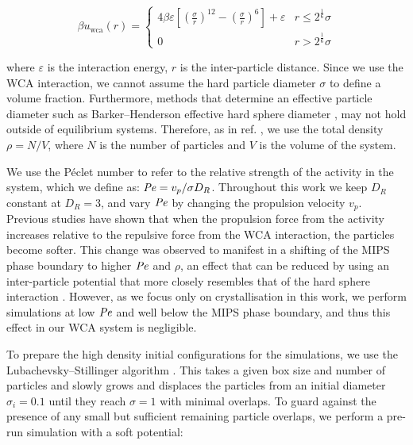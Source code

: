 \begin{equation}
\beta u_\mathrm{wca}(r) = \begin{cases}
4 \beta \varepsilon\left[\left(\frac{\sigma}{r}\right)^{12} - \left(\frac{\sigma}{r}\right)^{6}\right] + \varepsilon & r \leq 2^{\frac{1}{6}}\sigma \\%
0 & r > 2^{\frac{1}{6}}\sigma   
\end{cases}
\label{eqWCA}
\end{equation}


\noindent
where $\varepsilon$ is the interaction energy, $r$ is the inter-particle distance. Since we use the WCA interaction, we cannot assume the hard particle diameter $\sigma$ to define a volume fraction. Furthermore, methods that determine an effective particle diameter such as Barker--Henderson effective hard sphere diameter \cite{barker1967}, may not hold outside of equilibrium systems. Therefore, as in ref. \cite{martin-roca2021}, we use the total density $\rho = N / V$, where $N$ is the number of particles and $V$ is the volume of the system.  

We use the P\'{e}clet number to refer to the relative strength of the activity in the system, which we define as: $\operatorname{\mathit{P\kern-.08em e}} = v_p/\sigma D_{R}$. Throughout this work we keep $D_R$ constant at $D_R =3$, and vary $\operatorname{\mathit{P\kern-.08em e}}$ by changing the propulsion velocity $v_p$. Previous studies \cite{stenhammar2014,martin-roca2021} have shown that when the propulsion force from the activity increases relative to the repulsive force from the WCA interaction, the particles become softer. This change was observed to manifest in a shifting of the MIPS phase boundary to higher $\operatorname{\mathit{P\kern-.08em e}}$ and $\rho$, an effect that can be reduced by using an inter-particle potential that more closely resembles that of the hard sphere interaction \cite{martin-roca2021}. However, as we focus only on crystallisation in this work, we perform simulations at low $\operatorname{\mathit{P\kern-.08em e}}$ and well below the MIPS phase boundary, and thus this effect in our WCA system is negligible.
 

To prepare the high density initial configurations for the simulations, we use the Lubachevsky--Stillinger algorithm \cite{lubachevsky1990}.
This takes a given box size and number of particles and slowly grows and displaces the particles from an initial diameter $\sigma_i=0.1$ until they reach $\sigma=1$ with minimal overlaps. To guard against the presence of any small but sufficient remaining particle overlaps, we perform a pre-run simulation with a soft potential:



